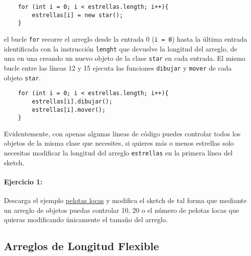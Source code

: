 \documentclass[11pt]{article}
\begin{document}
\begin{verbatim}
    for (int i = 0; i < estrellas.length; i++){
        estrellas[i] = new star();
    }
\end{verbatim}

el bucle \texttt{for} recorre el arreglo desde la entrada 0
(\texttt{i\ =\ 0}) hasta la última entrada identificada con la
instrucción \texttt{lenght} que devuelve la longitud del arreglo, de una
en una creando un nuevo objeto de la clase \texttt{star} en cada
entrada. El mismo bucle entre las líneas 12 y 15 ejecuta las funciones
\texttt{dibujar} y \texttt{mover} de cada objeto \texttt{star}.

\begin{verbatim}
    for (int i = 0; i < estrellas.length; i++){
        estrellas[i].dibujar();
        estrellas[i].mover();
    }
\end{verbatim}

Evidentemente, con apenas algunas lineas de código puedes controlar
todos los objetos de la misma clase que necesites, si quieres más o
menos estrellas solo necesitas modificar la longitud del arreglo
\texttt{estrellas} en la primera línea del sketch.

\hypertarget{ejercicio-1}{%
\paragraph{Ejercicio 1:}\label{ejercicio-1}}

Descarga el ejemplo
\href{https://github.com/piratax007/processing_course/tree/master/Ejemplos/pelotas_locas}{pelotas
locas} y modifica el sketch de tal forma que mediante un arreglo de
objetos puedas controlar 10, 20 o el número de pelotas locas que quieras
modificando únicamente el tamaño del arreglo.

\hypertarget{arreglos-de-longitud-flexible}{%
\subsection{Arreglos de Longitud
Flexible}\label{arreglos-de-longitud-flexible}}
\end{document}
